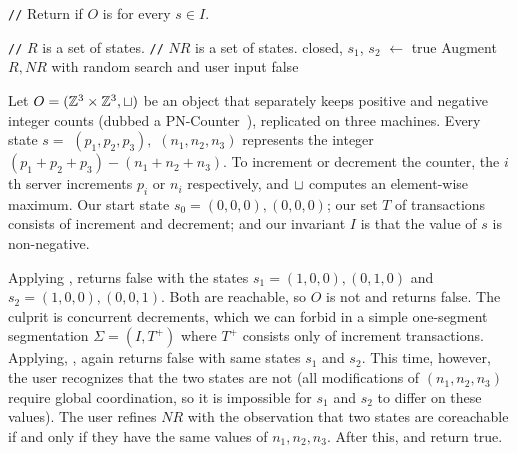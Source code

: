 \newcommand{\algocomment}[1]{\State \textcolor{flatdenim}{\texttt{//} #1}}
\begin{algorithm}[t]
  \caption{%
    Interactive \invariantconfluence{} decision procedure for arbitrary start
    state $s \in I$
  }%
  \begin{algorithmic}
    \algocomment{Return if $O$ is  for every $s \in I$.}
      \State \Return {}
    \EndFunction

    \State

    \algocomment{$R$ is a set of \TIcoreachable{} states.}
    \algocomment{$NR$ is a set of \TIcounreachable{} states.}
      \State closed, $s_1$, $s_2$ $\gets$ 
        \Return true
      \EndIf
      \State Augment $R, NR$ with random search and user input
        \Return false
      \EndIf
      \State \Return {}
    \EndFunction
  \end{algorithmic}
\end{algorithm}

\begin{example}
  Let $O = (\mathbb{Z}^3 \times \mathbb{Z}^3, \sqcup)$ be an object that separately keeps positive and negative integer counts (dubbed a
  PN-Counter~\cite{shapiro2011comprehensive}), replicated on three machines.
  Every state $s = $ $(p_1, p_2, p_3),$ $(n_1, n_2, n_3)$ represents the
  integer $(p_1 + p_2 + p_3) - (n_1 + n_2 + n_3)$. To increment or decrement
  the counter, the $i$th server increments $p_i$ or $n_i$ respectively, and
  $\sqcup$ computes an element-wise maximum. Our start state $s_0 = (0, 0, 0),
  (0, 0, 0)$; our set $T$ of transactions consists of increment and decrement;
  and our invariant $I$ is that the value of $s$ is non-negative.

  Applying , \IsIclosed{} returns false
  with the states $s_1 = (1, 0, 0), (0, 1, 0)$ and $s_2 = (1, 0, 0), (0, 0,
  1)$. Both are reachable, so $O$ is not \sTIconfluent{} and
   returns false.  The culprit is
  concurrent decrements, which we can forbid in a simple one-segment
  segmentation $\Sigma = (I, T^+)$ where $T^+$ consists only of increment
  transactions. Applying, ,
  \IsIclosed{} again returns false with same states $s_1$ and $s_2$. This time,
  however, the user recognizes that the two states are not
   (all modifications of $(n_1, n_2, n_3)$ require global
  coordination, so it is impossible for $s_1$ and $s_2$ to differ on these
  values).
  The user refines $NR$ with the observation that two
  states are coreachable if and only if they have the same values of $n_1, n_2,
  n_3$. After this, \IsIclosed{} and
   return true.
\end{example}

